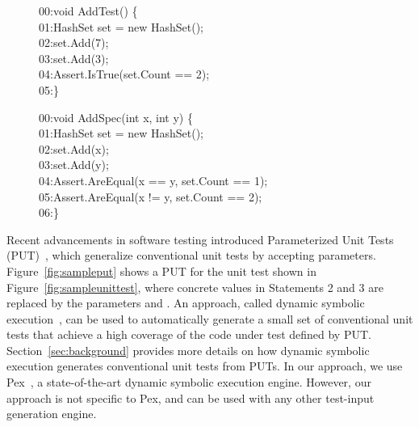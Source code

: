 \begin{figure}[t]
\begin{CodeOut}
00:void AddTest() \{\\
01:\hspace*{0.2in}HashSet set = new HashSet();\\
02:\hspace*{0.2in}set.Add(7);\\
03:\hspace*{0.2in}set.Add(3);\\
04:\hspace*{0.2in}Assert.IsTrue(set.Count == 2);\\
05:\}
\end{CodeOut}\vspace*{-4ex}
\begin{CodeOut}
00:void AddSpec(int x, int y) \{\\
01:\hspace*{0.2in}HashSet set = new HashSet();\\
02:\hspace*{0.2in}set.Add(x);\\
03:\hspace*{0.2in}set.Add(y);\\
04:\hspace*{0.2in}Assert.AreEqual(x == y, set.Count == 1);\\
05:\hspace*{0.2in}Assert.AreEqual(x != y, set.Count == 2);\\
06:\}
\end{CodeOut}\vspace*{-4ex}
\vspace*{-5ex}
\end{figure}

Recent advancements in software testing introduced Parameterized Unit Tests (PUT)~\cite{tillmann05:parameterized}, which generalize conventional unit tests by accepting parameters. Figure~\ref{fig:sampleput} shows a PUT for the unit test shown in Figure~\ref{fig:sampleunittest}, where concrete values in Statements 2 and 3 are replaced by the parameters  and . An approach, called dynamic symbolic execution~\cite{Clarke:symbolic, godefroid:dart, king:symex, koushik:cute}, can be used to automatically generate a small set of conventional unit tests that achieve a high coverage of the code under test defined by PUT. Section~\ref{sec:background} provides more details on how dynamic symbolic execution generates conventional unit tests from PUTs. In our approach, we use Pex~\cite{tillman:pexwhite}, a state-of-the-art 
dynamic symbolic execution engine. However, our approach is not specific to Pex, and can be used with any other test-input generation engine.

